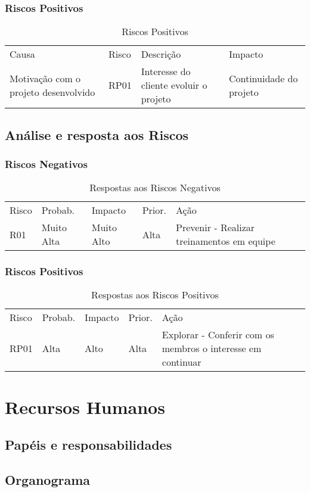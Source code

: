 \subsubsection{Riscos Positivos}

\begin{table}[htp]
\centering
\caption{Riscos Positivos}
\label{riscos-positivos}
\begin{tabular}{llll}
Causa                                & Risco & Descrição                              & Impacto                 \\
Motivação com o projeto desenvolvido & RP01  & Interesse do cliente evoluir o projeto & Continuidade do projeto
\end{tabular}
\end{table}

\subsection{Análise e resposta aos Riscos}

\subsubsection{Riscos Negativos}

\begin{table}[htp]
\centering
\caption{Respostas aos Riscos Negativos}
\label{respostas-riscos-negativos}
\begin{tabular}{lllll}
Risco & Probab.    & Impacto    & Prior. & Ação                                       \\
R01   & Muito Alta & Muito Alto & Alta   & Prevenir - Realizar treinamentos em equipe
\end{tabular}
\end{table}

\subsubsection{Riscos Positivos}

\begin{table}[htp]
\centering
\caption{Respostas aos Riscos Positivos}
\label{respostas-riscos-positivos}
\begin{tabular}{lllll}
Risco & Probab. & Impacto & Prior. & Ação                                                        \\
RP01  & Alta    & Alto    & Alta   & Explorar - Conferir com os membros o interesse em continuar
\end{tabular}
\end{table}

\section{Recursos Humanos}
\subsection{Papéis e responsabilidades}
\subsection{Organograma}




